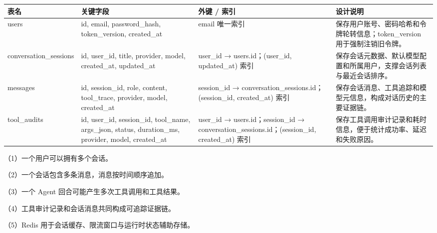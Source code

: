 \documentclass[UTF8]{ctexart}
\begin{document}
\begin{longtable}[]{@{}
  >{\raggedright\arraybackslash}p{}
  >{\raggedright\arraybackslash}p{}
  >{\raggedright\arraybackslash}p{}
  >{\raggedright\arraybackslash}p{}@{}}
\toprule\noalign{}
\begin{minipage}[b]{\linewidth}\raggedright
表名
\end{minipage} & \begin{minipage}[b]{\linewidth}\raggedright
关键字段
\end{minipage} & \begin{minipage}[b]{\linewidth}\raggedright
外键 / 索引
\end{minipage} & \begin{minipage}[b]{\linewidth}\raggedright
设计说明
\end{minipage} \\
\midrule\noalign{}
\endhead
\bottomrule\noalign{}
\endlastfoot
users & id, email, password\_hash, token\_version, created\_at & email
唯一索引 & 保存用户账号、密码哈希和令牌轮转信息；token\_version
用于强制注销旧令牌。 \\
conversation\_sessions & id, user\_id, title, provider, model,
created\_at, updated\_at & user\_id → users.id；(user\_id, updated\_at)
索引 &
保存会话元数据、默认模型配置和所属用户，支撑会话列表与最近会话排序。 \\
messages & id, session\_id, role, content, tool\_trace, provider, model,
created\_at & session\_id → conversation\_sessions.id；(session\_id,
created\_at) 索引 &
保存会话消息、工具追踪和模型元信息，构成对话历史的主要证据链。 \\
tool\_audits & id, user\_id, session\_id, tool\_name, args\_json,
status, duration\_ms, provider, model, created\_at & user\_id →
users.id；session\_id → conversation\_sessions.id；(session\_id,
created\_at) 索引 &
保存工具调用审计记录和耗时信息，便于统计成功率、延迟和失败原因。 \\
\end{longtable}

（1）一个用户可以拥有多个会话。

（2）一个会话包含多条消息，消息按时间顺序追加。

（3）一个 Agent 回合可能产生多次工具调用和工具结果。

（4）工具审计记录和会话消息共同构成可追踪证据链。

（5）Redis 用于会话缓存、限流窗口与运行时状态辅助存储。
\end{document}
